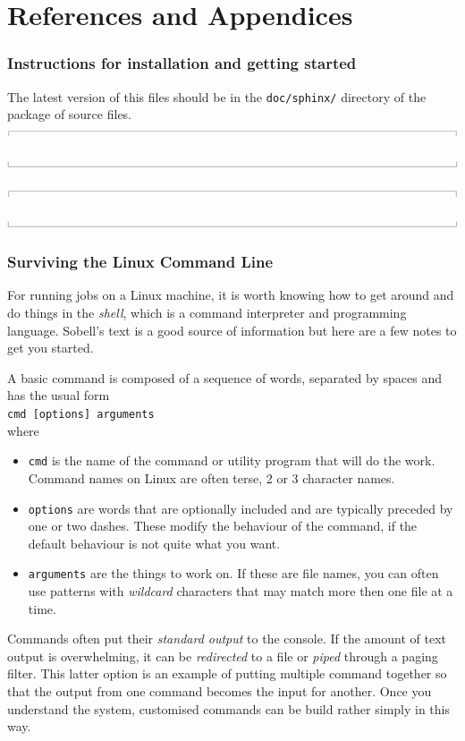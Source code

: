 \documentclass[12pt,a4paper,twoside]{article}
\newcommand{\topbar}{\ensuremath{
    \rule{0.1mm}{2.0mm} \rule[2.0mm]{159.5mm}{0.1mm} \rule{0.1mm}{2.0mm}
}}
\newcommand{\bottombar}{\ensuremath{
    \rule{0.1mm}{2.0mm} \rule{159.5mm}{0.1mm} \rule{0.1mm}{2.0mm}
}}
\begin{document}
\part{References and Appendices}




\cleardoublepage
\appendix

\section{Instructions for installation and getting started}
\label{getting-started-file}
%
The latest version of this files should be in the \texttt{doc/sphinx/} directory 
of the package of source files.\\
\topbar

\bottombar

\noindent
\topbar

\bottombar

\cleardoublepage
\section{Surviving the Linux Command Line}
\label{linux-command-notes-sec}
For running jobs on a Linux machine, it is worth knowing how to get around and do things in the \textit{shell},
which is a command interpreter and programming language.
Sobell's text \cite{sobell_2005a} is a good source of information but here are a few notes to get you started.

\medskip
A basic command is composed of a sequence of words, separated by spaces and has the usual form\\
\texttt{cmd [options] arguments}\\
where 
\begin{itemize}
 \item\texttt{cmd} is the name of the command or utility program that will do the work.
   Command names on Linux are often terse, 2 or 3 character names.
 \item\texttt{options} are words that are optionally included and are typically preceded by one or two dashes.
   These modify the behaviour of the command, if the default behaviour is not quite what you want.
 \item \texttt{arguments} are the things to work on.
   If these are file names, you can often use patterns with \textit{wildcard} characters that may match
   more then one file at a time.
\end{itemize}
Commands often put their \textit{standard output} to the console.
If the amount of text output is overwhelming, it can be \textit{redirected} to a file 
or \textit{piped} through a paging filter.
This latter option is an example of putting multiple command together so that the output from
one command becomes the input for another.
Once you understand the system, customised commands can be build rather simply in this way.
\end{document}
